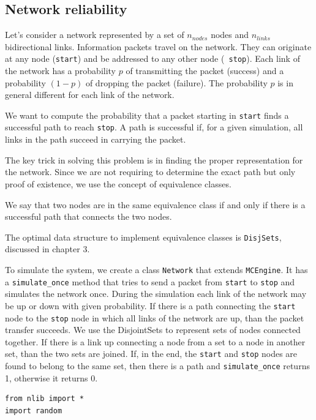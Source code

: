 \documentclass[justified,sixbynine]{tufte-book}
\def\ft{\small\tt}
\theoremstyle{plain}%
\theoremstyle{definition}
\theoremstyle{remark}
\begin{document}
\begin{fullwidth}
\subsection{Network reliability}

Let's consider a network represented by a set of $n_{nodes}$ nodes and $%
n_{links}$ bidirectional links. Information
packets travel on the network. They can
originate at any node ({\ft start}) and be addressed to any other node ({\ft %
stop}). Each link of the network has a probability $p$ of transmitting the
packet (success) and a probability $(1-p)$ of dropping the packet (failure).
The probability $p$ is in general different for each link of the network.

We want to compute the probability that a packet
starting in {\ft start} finds a successful path to reach {\ft stop}. A path
is successful if, for a given simulation, all links in the path succeed in
carrying the packet.

The key trick in solving this problem is in finding the proper
representation for the network. Since we are not requiring to determine the
exact path but only proof of existence, we use the concept of equivalence classes.

We say that two nodes are in the same equivalence class if and only
if there is a successful path that connects the two nodes.

The optimal data structure to implement equivalence classes is {\ft DisjSets}, discussed in chapter 3.

To simulate the system, we create a class {\ft Network} that extends {\ft MCEngine}. It has a {\ft simulate\_once} method that tries to send a packet from {\ft start} to
{\ft stop} and simulates the network once. During the simulation each link of the network may be up or down with given probability. If there is a path connecting the {\ft start} node to the {\ft stop} node in which all links of the network are up, than the packet transfer succeeds. We use the DisjointSets to represent sets of nodes connected together. If there is a link up connecting a node from a set to a node in another set, than the two sets are joined. If, in the end, the {\ft start} and {\ft stop} nodes are found to belong to the same set, then there is a path and {\ft simulate\_once} returns 1, otherwise it returns 0.


\begin{lstlisting}[caption={in file: {\ft network.py}}]
from nlib import *
import random


\end{lstlisting}
\end{fullwidth}
\end{document}
